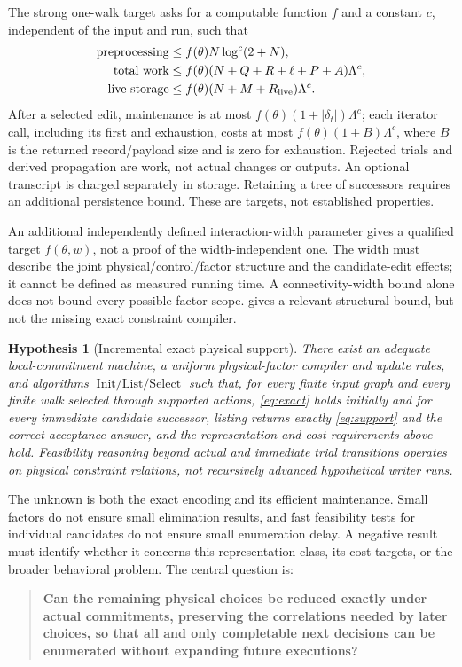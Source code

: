 \documentclass[11pt,a4paper]{article}
\newtheorem{hypothesis}{Hypothesis}
\begin{document}
The strong one-walk target asks for a computable function \(f\) and a constant
\(c\), independent of the input and run, such that
\begin{align}
 \text{preprocessing}&\le f(\theta)N\log^c(2+N),\nonumber\\
 \text{total work}&\le f(\theta)(N+Q+R+\ell+P+A)\Lambda^c,\label{eq:cost}\\
 \text{live storage}&\le f(\theta)(N+M+R_{\rm live})\Lambda^c.\nonumber
\end{align}
After a selected edit, maintenance is at most
\(f(\theta)(1+|\delta_t|)\Lambda^c\); each iterator call, including its first and
exhaustion, costs at most \(f(\theta)(1+B)\Lambda^c\), where \(B\) is the returned
record/payload size and is zero for exhaustion. Rejected trials and derived
propagation are work, not actual changes or outputs. An optional transcript is
charged separately in storage. Retaining a tree of successors requires an
additional persistence bound. These are targets, not established properties.

An additional independently defined interaction-width parameter gives a
qualified target \(f(\theta,w)\), not a proof of the width-independent one.
The width must describe the joint physical/control/factor structure and the
candidate-edit effects; it cannot be defined as measured running time. A
connectivity-width bound alone does not bound every possible factor scope.
 gives a relevant structural bound, but not the missing exact
constraint compiler.

\begin{hypothesis}[Incremental exact physical support]\label{hyp:main}
There exist an adequate local-commitment machine, a uniform physical-factor
compiler and update rules, and algorithms \(\operatorname{Init/List/Select}\)
such that, for every finite input graph and every finite walk selected through
supported actions, \eqref{eq:exact} holds initially and for every immediate
candidate successor, listing returns exactly \eqref{eq:support} and the correct
acceptance answer, and the representation and cost requirements above hold.
Feasibility reasoning beyond actual and immediate trial transitions operates
on physical constraint relations, not recursively advanced hypothetical writer
runs.
\end{hypothesis}

The unknown is both the exact encoding and its efficient maintenance. Small
factors do not ensure small elimination results, and fast feasibility tests for
individual candidates do not ensure small enumeration delay. A negative result
must identify whether it concerns this representation class, its cost targets,
or the broader behavioral problem. The central question is:
\begin{quote}
\textbf{Can the remaining physical choices be reduced exactly under actual
commitments, preserving the correlations needed by later choices, so that all
and only completable next decisions can be enumerated without expanding future
executions?}
\end{quote}
\end{document}
